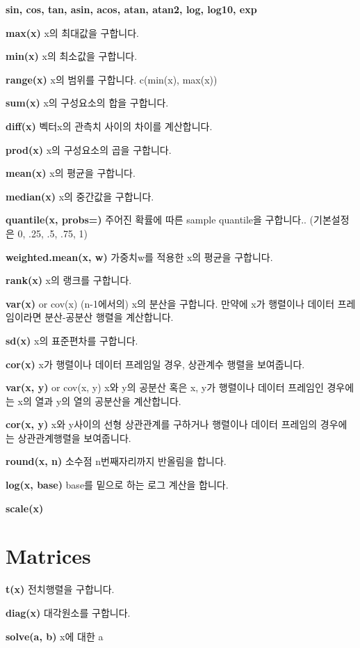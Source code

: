 \documentclass[landscape,twocolumn,letterpaper]{article}
\begin{document}
\textbf{sin, cos, tan, asin, acos, atan, atan2, log, log10, exp}

\textbf{max(x)} x의 최대값을 구합니다.

\textbf{min(x)} x의 최소값을 구합니다.

\textbf{range(x)} x의 범위를 구합니다. c(min(x), max(x))

\textbf{sum(x)} x의 구성요소의 합을 구합니다.

\textbf{diff(x)} 벡터x의 관측치 사이의 차이를 계산합니다.

\textbf{prod(x)} x의 구성요소의 곱을 구합니다.

\textbf{mean(x)} x의 평균을 구합니다.

\textbf{median(x)} x의 중간값을 구합니다.

\textbf{quantile(x, probs=)} 주어진 확률에 따른 sample quantile을 구합니다.. (기본설정은 0, .25,
.5, .75, 1)

\textbf{weighted.mean(x, w)} 가중치w를 적용한 x의 평균을 구합니다.

\textbf{rank(x)} x의 랭크를 구합니다.

\textbf{var(x)} or cov(x) (n-1에서의) x의 분산을 구합니다. 만약에 x가 행렬이나 데이터 프레임이라면 분산-공분산
행렬을 계산합니다.

\textbf{sd(x)} x의 표준편차를 구합니다.

\textbf{cor(x)} x가 행렬이나 데이터 프레임일 경우, 상관계수 행렬을 보여줍니다.

\textbf{var(x, y) }or cov(x, y) x와 y의 공분산 혹은 x, y가 행렬이나 데이터 프레임인 경우에는 x의 열과 y의
열의 공분산을 계산합니다.

\textbf{cor(x, y)} x와 y사이의 선형 상관관계를 구하거나 행렬이나 데이터 프레임의 경우에는 상관관계행렬을 보여줍니다.

\textbf{round(x, n) }소수점 n번째자리까지 반올림을 합니다.

\textbf{log(x, base)} base를 밑으로 하는 로그 계산을 합니다.

\textbf{scale(x)}


\section{Matrices}

\textbf{t(x)} 전치행렬을 구합니다.

\textbf{diag(x)} 대각원소를 구합니다.


\textbf{solve(a, b)} x에 대한 a%
\end{document}
